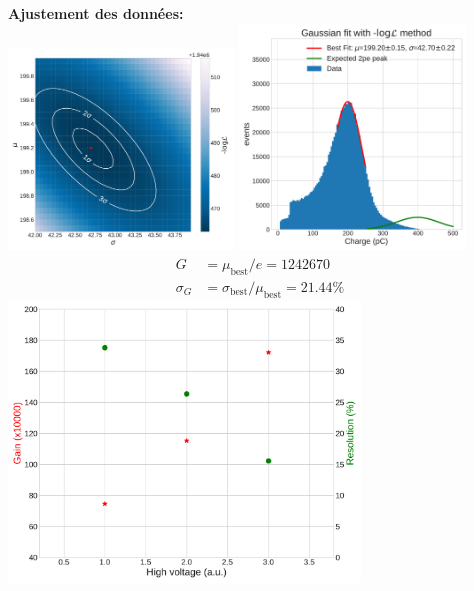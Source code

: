{\begin{additional}
\textbf{Ajustement des donn{\'e}es:}\\
\includegraphics[width=0.45\textwidth]{exampleAnalysis/plots/Likelihood_Data_electron_VME.pdf}\hfill
\includegraphics[width=0.45\textwidth]{exampleAnalysis/plots/LLH_Fit_electron_VME.pdf}
\begin{align*}
G &= \mu_{\text{best}}/e = 1242670 \\
\sigma_G &= \sigma_{\text{best}} / \mu_{\text{best}} = 21.44\%
\end{align*}
{\centering
\includegraphics[width=0.7\textwidth]{exampleAnalysis/plots/Electron_Gain_Resolution_HV_VME.pdf}\\}
\end{additional}
}

